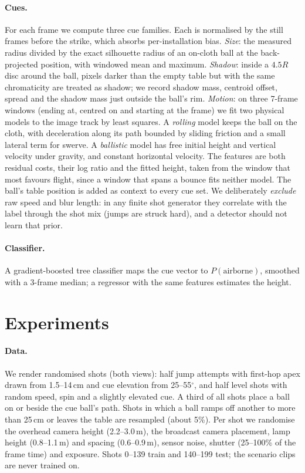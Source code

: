 \documentclass[11pt]{article}
\begin{document}
\paragraph{Cues.}
For each frame we compute three cue families. Each is normalised by the still
frames before the strike, which absorbs per-installation bias.
\emph{Size}: the measured radius divided by the exact silhouette radius
of an on-cloth ball at the back-projected position, with windowed mean and
maximum.
\emph{Shadow}: inside a $4.5R$ disc around the ball, pixels darker than the empty
table but with the same chromaticity are treated as shadow; we record shadow
mass, centroid offset, spread and the shadow mass just outside the ball's rim.
\emph{Motion}: on three 7-frame windows (ending at, centred on and starting at
the frame) we fit two physical models to the image track by least squares.
A \emph{rolling} model keeps the ball on the cloth, with deceleration along its
path bounded by sliding friction and a small lateral term for swerve. A
\emph{ballistic} model has free initial height and vertical velocity under
gravity, and constant horizontal velocity. The features are both residual costs, their
log ratio and the fitted height, taken from the window that most favours
flight, since a window that spans a bounce fits neither model. The ball's table
position is added as context to every cue set. We deliberately \emph{exclude}
raw speed and blur length: in any finite shot generator they correlate with
the label through the shot mix (jumps are struck hard), and a detector should
not learn that prior.

\paragraph{Classifier.}
A gradient-boosted tree classifier maps the cue vector to $P(\text{airborne})$,
smoothed with a 3-frame median; a regressor with the same features estimates the height.

\section{Experiments}\label{sec:protocol}

\paragraph{Data.}
We render \NumShots{} randomised shots (both views): half jump attempts
with first-hop apex drawn from 1.5--14\,cm and cue elevation from
25--55$^\circ$, and half level shots with random speed, spin and a slightly
elevated cue. A third of all shots place a ball on or beside the cue ball's path.
Shots in which a ball ramps off another to more than 25\,cm or leaves the table
are resampled (about 5\%). Per shot we randomise the overhead camera height
(2.2--3.0\,m), the broadcast camera placement, lamp height (0.8--1.1\,m) and
spacing (0.6--0.9\,m), sensor noise, shutter (25--100\% of the frame time) and exposure.
Shots 0--139 train and 140--199 test; the scenario clips are never trained on.
\end{document}
